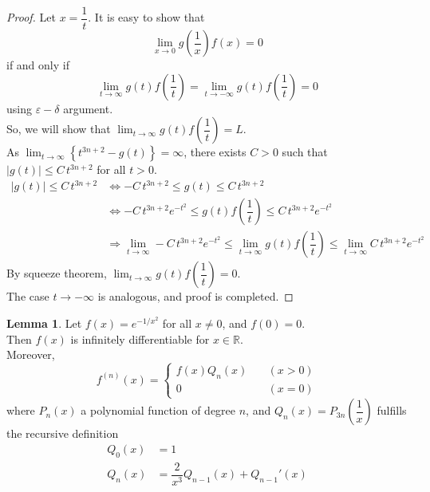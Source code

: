 \documentclass[12pt]{book}
\theoremstyle{definition}
\newtheorem{lemma}{Lemma}
\newcommand{\R}{\mathbb{R}}
\begin{document}
		\begin{proof}
			Let $x=\dfrac{1}{t}$. It is easy to show that \begin{equation*}
				\displaystyle\lim_{x\rightarrow 0}g\left(\dfrac{1}{x}\right)f(x)=0
			\end{equation*} if and only if
			\begin{equation*}
				\displaystyle\lim_{t\rightarrow\infty}g(t)f\left(\dfrac{1}{t}\right)=\lim_{t\rightarrow-\infty}g(t)f\left(\dfrac{1}{t}\right)=0
			\end{equation*} using $\varepsilon-\delta$ argument.\\
			So, we will show that $\displaystyle\lim_{t\rightarrow \infty}g(t)f\left(\dfrac{1}{t}\right)=L.$\\
			As $\displaystyle\lim_{t\rightarrow \infty}\left\{t^{3n+2}-g(t)\right\}=\infty$, there exists $C>0$ such that $\left\vert g(t)\right\rvert \leq C\,t^{3n+2}$ for all $t> 0$.
			\begin{align*}
				|g(t)|\leq C\,t^{3n+2} &\Leftrightarrow -C\,t^{3n+2}\leq g(t) \leq C\,t^{3n+2}\\
				&\Leftrightarrow -C\,t^{3n+2}e^{-t^2}\leq g(t)f\left(\dfrac{1}{t}\right) \leq C\,t^{3n+2}e^{-t^2}\\
				&\Rightarrow \displaystyle\lim_{t\rightarrow \infty}-C\,t^{3n+2}e^{-t^2}\leq \lim_{t\rightarrow \infty}g(t)f\left(\dfrac{1}{t}\right) \leq \lim_{t\rightarrow\infty}C\,t^{3n+2}e^{-t^2}
			\end{align*}
			By squeeze theorem, $\displaystyle\lim_{ t\rightarrow \infty} g(t)f\left(\dfrac{1}{t}\right)=0$.\\
			The case $t\rightarrow-\infty$ is analogous, and proof is completed.
		\end{proof}
		\newpage
		\begin{lemma}
			Let $f(x)=e^{-1/x^2}$ for all $x\neq0$, and $f(0)=0$.\\
			Then $f(x)$ is infinitely differentiable for $x\in\R$.\\
			Moreover,
			\begin{equation*}
				f^{(n)}(x)=
					\begin{cases}
						f(x)Q_n(x)&\quad (x>0)\\
						0&\quad (x=0)
					\end{cases}
			\end{equation*}
			where $P_n(x)$ a polynomial function of degree $n$, and $Q_n(x)=P_{3n}\left(\dfrac{1}{x}\right)$ fulfills the recursive definition
			\begin{align*}
				Q_0(x)&=1 \\
				Q_n(x)&=\dfrac{2}{x^3}Q_{n-1}(x)+Q_{n-1}'(x)
			\end{align*}
		\end{lemma}
\end{document}

